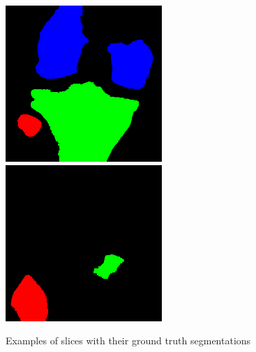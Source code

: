 \begin{figure}[H]
\endminipage\hfill
{}%
  \includegraphics[width=\linewidth]{imgs/y3.png}
\endminipage\hfill
{}%
  \includegraphics[width=\linewidth]{imgs/y4.png}
\endminipage
\caption{Examples of slices with their ground truth segmentations}
\end{figure}

